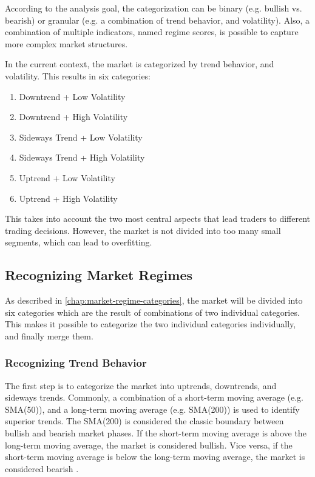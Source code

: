According to the analysis goal, the categorization can be binary (e.g. bullish vs. bearish) or granular (e.g. a combination of trend behavior, and volatility).
Also, a combination of multiple indicators, named regime scores, is possible to capture more complex market structures.

In the current context, the market is categorized by trend behavior, and volatility.
This results in six categories:

\begin{enumerate}
    \item Downtrend + Low Volatility
    \item Downtrend + High Volatility
    \item Sideways Trend + Low Volatility
    \item Sideways Trend + High Volatility
    \item Uptrend + Low Volatility
    \item Uptrend + High Volatility
\end{enumerate}

This takes into account the two most central aspects that lead traders to different trading decisions.
However, the market is not divided into too many small segments, which can lead to overfitting.

\subsection{Recognizing Market Regimes}

As described in \autoref{chap:market-regime-categories}, the market will be divided into six categories which are the result of combinations of two individual categories.
This makes it possible to categorize the two individual categories individually, and finally merge them.

\subsubsection{Recognizing Trend Behavior}
\label{chap:recognizing-trend}

The first step is to categorize the market into uptrends, downtrends, and sideways trends.
Commonly, a combination of a short-term moving average (e.g.
SMA(50)), and a long-term moving average (e.g.
SMA(200)) is used to identify superior trends.
The SMA(200) is considered the classic boundary between bullish and bearish market phases.
If the short-term moving average is above the long-term moving average, the market is considered bullish.
Vice versa, if the short-term moving average is below the long-term moving average, the market is considered bearish \cite{ig-regimes-mas}.

